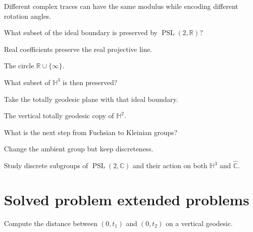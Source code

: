 \begin{solution}
Different complex traces can have the same modulus while encoding different rotation angles.
\end{solution}

\begin{exercise}\label{exr:vii36-22}
What subset of the ideal boundary is preserved by \(\operatorname{PSL}(2,\mathbb R)\)?
\end{exercise}

\begin{hint}
Real coefficients preserve the real projective line.
\end{hint}

\begin{solution}
The circle \(\mathbb R\cup\{\infty\}\).
\end{solution}

\begin{exercise}\label{exr:vii36-23}
What subset of \(\mathbb H^3\) is then preserved?
\end{exercise}

\begin{hint}
Take the totally geodesic plane with that ideal boundary.
\end{hint}

\begin{solution}
The vertical totally geodesic copy of \(\mathbb H^2\).
\end{solution}

\begin{exercise}\label{exr:vii36-24}
What is the next step from Fuchsian to Kleinian groups?
\end{exercise}

\begin{hint}
Change the ambient group but keep discreteness.
\end{hint}

\begin{solution}
Study discrete subgroups of \(\operatorname{PSL}(2,\mathbb C)\) and their action on both \(\mathbb H^3\) and \(\widehat{\mathbb C}\).
\end{solution}

\section{Solved problem extended problems}

\begin{problem}\label{prob:vii36-01}
Compute the distance between \((0,t_1)\) and \((0,t_2)\) on a vertical geodesic.
\end{problem}

